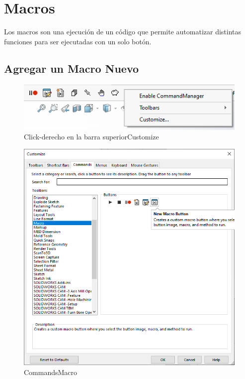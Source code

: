 \documentclass{report}
\begin{document}
\chapter{Macros}

Los macros son una ejecución de un código que permite automatizar distintas funciones para ser ejecutadas con un solo botón.

\section{Agregar un Macro Nuevo}

	\begin{figure}[H]
	\centering
	\includegraphics[width=0.85\linewidth, height=0.5\textheight,keepaspectratio]{Imagenes/solidworks_macro_01}
	\caption{Click-derecho en la barra superior\textrightarrow Customize}
	\label{fig:solidworksmacro01}
\end{figure}

\begin{figure}[H]
	\centering
	\includegraphics[width=0.85\linewidth, height=0.5\textheight,keepaspectratio]{Imagenes/solidworks_macro_02}
	\caption{Commands\textrightarrow Macro}
	\label{fig:solidworksmacro02}
\end{figure}
\end{document}
